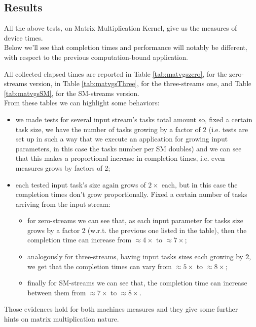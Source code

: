 \subsection{Results}
All the above tests, on Matrix Multiplication Kernel, give us the measures of device times.\\
Below we'll see that completion times and performance will notably be different, with respect to the previous computation-bound application.

All collected elapsed times are reported in Table \ref{tab:matvgszero}, for the zero-streams version, in Table \ref{tab:matvgsThree}, for the three-streams one, and Table \ref{tab:matvgsSM}, for the SM-streams version.\\
From these tables we can highlight some behaviors:
\begin{itemize}
	\item we made tests for several input stream's tasks total amount so, fixed a certain task size, we have the number of tasks growing by a factor of 2 (i.e. tests are set up in such a way that we execute an application for growing input parameters, in this case the tasks number per SM doubles) and we can see that this makes a proportional increase in completion times, i.e. even measures grows by factors of 2;
	
	\item each tested input task's size again grows of \(2\times\) each, but in this case the completion times don't grow proportionally. Fixed a certain number of tasks arriving from the input stream:
	\begin{itemize}
		\item for zero-streams we can see that, as each input parameter for tasks size grows by a factor 2 (w.r.t. the previous one listed in the table), then the completion time can increase from \(\approx4\times\) to \(\approx7\times\); 
		
		\item analogously for three-streams, having input tasks sizes each growing by 2, we get that the completion times can vary from \(\approx5\times\) to \(\approx8\times\); 
		
		\item finally for SM-streams we can see that, the completion time can increase between them from \(\approx7\times\) to \(\approx8\times\).
	\end{itemize}
	
\end{itemize}
Those evidences hold for both machines measures and they give some further hints on matrix multiplication nature.\\
